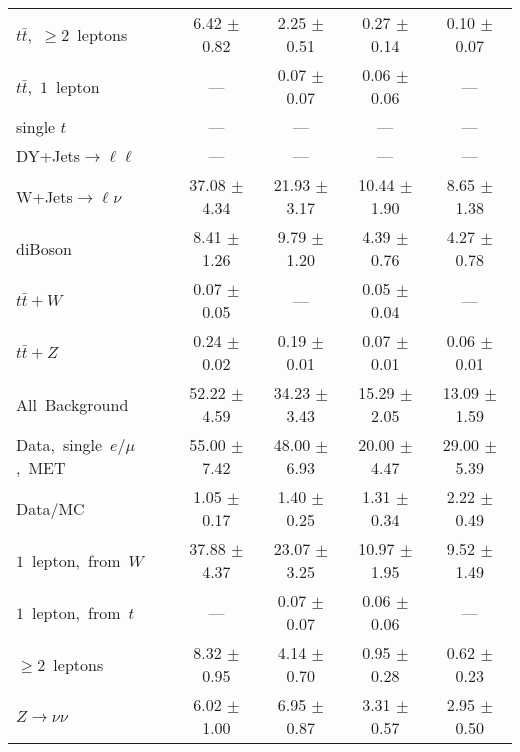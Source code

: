 \documentclass{article}
\begin{document}
\begin{longtable}{|l|c|c|c|c|}
$t\bar{t}$,~$\ge2$~leptons & 6.42 $\pm$ 0.82  & 2.25 $\pm$ 0.51  & 0.27 $\pm$ 0.14  & 0.10 $\pm$ 0.07 \\* 
$t\bar{t}$,~$1$~lepton & ---  & 0.07 $\pm$ 0.07  & 0.06 $\pm$ 0.06  & --- \\* 
single $t$  & ---  & ---  & ---  & --- \\* 
DY+Jets$\rightarrow\ell\ell$  & ---  & ---  & ---  & --- \\* 
W+Jets$\rightarrow\ell\nu$  & 37.08 $\pm$ 4.34  & 21.93 $\pm$ 3.17  & 10.44 $\pm$ 1.90  & 8.65 $\pm$ 1.38 \\* 
diBoson  & 8.41 $\pm$ 1.26  & 9.79 $\pm$ 1.20  & 4.39 $\pm$ 0.76  & 4.27 $\pm$ 0.78 \\* 
$t\bar{t}+W$  & 0.07 $\pm$ 0.05  & ---  & 0.05 $\pm$ 0.04  & --- \\* 
$t\bar{t}+Z$  & 0.24 $\pm$ 0.02  & 0.19 $\pm$ 0.01  & 0.07 $\pm$ 0.01  & 0.06 $\pm$ 0.01 \\* 
\hline \hline 
All~Background  & 52.22 $\pm$ 4.59  & 34.23 $\pm$ 3.43  & 15.29 $\pm$ 2.05  & 13.09 $\pm$ 1.59 \\* 
Data,~single~$e/\mu$,~MET  & 55.00 $\pm$ 7.42  & 48.00 $\pm$ 6.93  & 20.00 $\pm$ 4.47  & 29.00 $\pm$ 5.39 \\* 
Data/MC  & 1.05 $\pm$ 0.17  & 1.40 $\pm$ 0.25  & 1.31 $\pm$ 0.34  & 2.22 $\pm$ 0.49 \\* 
\hline \hline 
$1$~lepton,~from~$W$  & 37.88 $\pm$ 4.37  & 23.07 $\pm$ 3.25  & 10.97 $\pm$ 1.95  & 9.52 $\pm$ 1.49 \\* 
$1$~lepton,~from~$t$  & ---  & 0.07 $\pm$ 0.07  & 0.06 $\pm$ 0.06  & --- \\* 
$\ge2$~leptons  & 8.32 $\pm$ 0.95  & 4.14 $\pm$ 0.70  & 0.95 $\pm$ 0.28  & 0.62 $\pm$ 0.23 \\* 
$Z\rightarrow\nu\nu$  & 6.02 $\pm$ 1.00  & 6.95 $\pm$ 0.87  & 3.31 $\pm$ 0.57  & 2.95 $\pm$ 0.50 \\* 
\hline 
\end{longtable} 

 
 
 
 
\pagebreak 

 
 
 
 
\end{document}
